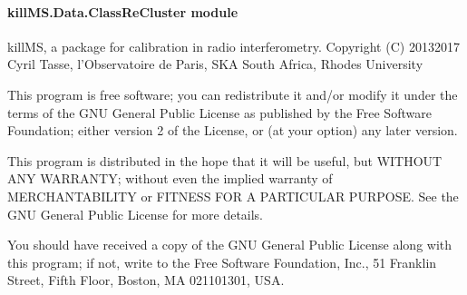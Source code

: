 \documentclass[letterpaper,10pt,english]{sphinxmanual}
\begin{document}
\paragraph{killMS.Data.ClassReCluster module}
\label{\detokenize{api/killMS.Data:module-killMS.Data.ClassReCluster}}\label{\detokenize{api/killMS.Data:killms-data-classrecluster-module}}
\sphinxAtStartPar
killMS, a package for calibration in radio interferometry.
Copyright (C) 2013\sphinxhyphen{}2017  Cyril Tasse, l’Observatoire de Paris,
SKA South Africa, Rhodes University

\sphinxAtStartPar
This program is free software; you can redistribute it and/or
modify it under the terms of the GNU General Public License
as published by the Free Software Foundation; either version 2
of the License, or (at your option) any later version.

\sphinxAtStartPar
This program is distributed in the hope that it will be useful,
but WITHOUT ANY WARRANTY; without even the implied warranty of
MERCHANTABILITY or FITNESS FOR A PARTICULAR PURPOSE.  See the
GNU General Public License for more details.

\sphinxAtStartPar
You should have received a copy of the GNU General Public License
along with this program; if not, write to the Free Software
Foundation, Inc., 51 Franklin Street, Fifth Floor, Boston, MA  02110\sphinxhyphen{}1301, USA.
\end{document}
